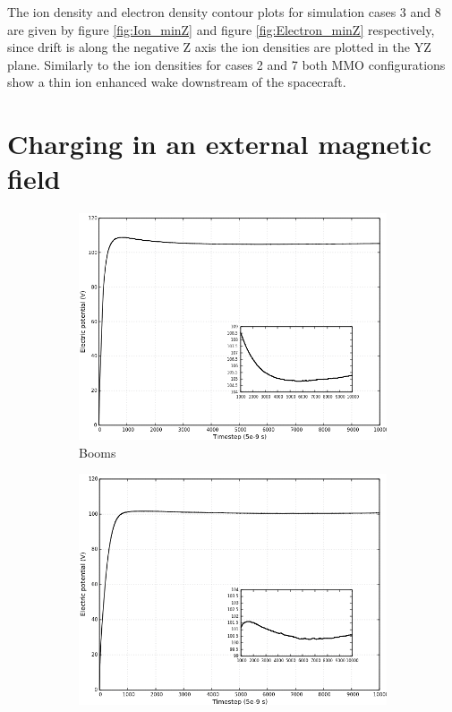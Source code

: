 The ion density and electron density contour plots for simulation cases 3 and 8 are given by figure \ref{fig:Ion_minZ} and figure \ref{fig:Electron_minZ} respectively, since drift is along the negative Z axis the ion densities are plotted in the YZ plane. Similarly to the ion densities for cases 2 and 7 both MMO configurations show a thin ion enhanced wake downstream of the spacecraft.


\section{Charging in an external magnetic field}

\begin{figure}[H]
  \begin{subfigure}[b]{0.75\textwidth}
  \includegraphics[width=\columnwidth]{figures/MMO/BField/WB/C_BField_WB.png}
  \caption{Booms}
  \label{fig:C_BField_WB}
\end{subfigure}
\par\bigskip
\begin{subfigure}[b]{0.75\textwidth}
  \includegraphics[width=\columnwidth]{figures/MMO/BField/NB/C_BField_NB.png}

\end{subfigure}
\end{figure}
